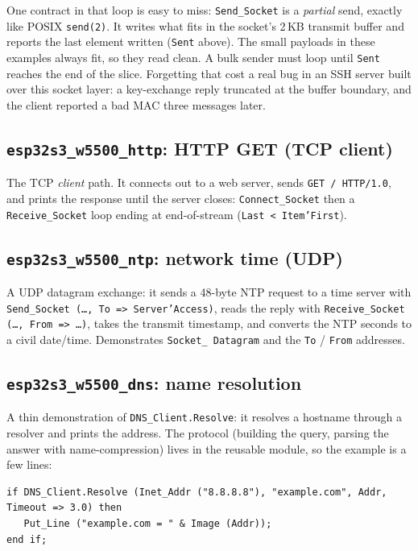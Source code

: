 One contract in that loop is easy to miss: \texttt{Send\_Socket} is a
\emph{partial} send, exactly like POSIX \texttt{send(2)}.
It writes what fits in the socket's 2\,KB transmit buffer and reports the last
element written (\texttt{Sent} above). The small payloads in these examples
always fit, so they read clean. A bulk sender must loop until \texttt{Sent}
reaches the end of the slice. Forgetting that cost a real bug in an
SSH server built over this socket layer: a key-exchange reply truncated at the
buffer boundary, and the client reported a bad MAC three messages later.

\subsection{\texttt{esp32s3\_w5500\_http}: HTTP GET (TCP client)}

The TCP \emph{client} path. It connects out to a web server, sends
\texttt{GET / HTTP/1.0}, and prints the response until the server closes:
\texttt{Connect\_Socket} then a \texttt{Receive\_Socket} loop ending at
end-of-stream (\texttt{Last < Item'First}).

\subsection{\texttt{esp32s3\_w5500\_ntp}: network time (UDP)}

A UDP datagram exchange: it sends a 48-byte NTP request to a time server with
\texttt{Send\_Socket (\dots, To => Server'Access)}, reads the reply with
\texttt{Receive\_Socket (\dots, From => \dots)}, takes the transmit timestamp, and
converts the NTP seconds to a civil date/time. Demonstrates \texttt{Socket\_%
Datagram} and the \texttt{To} / \texttt{From} addresses.

\subsection{\texttt{esp32s3\_w5500\_dns}: name resolution}

A thin demonstration of \texttt{DNS\_Client.Resolve}: it resolves a hostname through
a resolver and prints the address. The protocol (building the query, parsing the
answer with name-compression) lives in the reusable module, so the example is a
few lines:

\begin{lstlisting}
if DNS_Client.Resolve (Inet_Addr ("8.8.8.8"), "example.com", Addr, Timeout => 3.0) then
   Put_Line ("example.com = " & Image (Addr));
end if;
\end{lstlisting}

